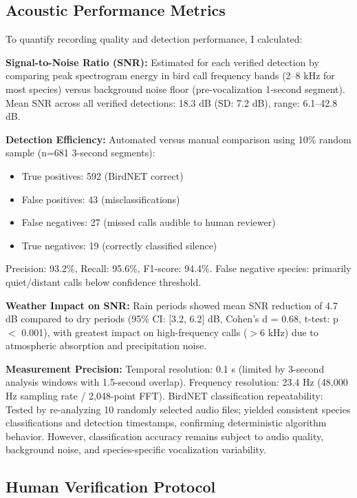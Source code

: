 \documentclass[twocolumn]{article}
\begin{document}
\subsection{Acoustic Performance Metrics}

To quantify recording quality and detection performance, I calculated:

\textbf{Signal-to-Noise Ratio (SNR):} Estimated for each verified detection by comparing peak spectrogram energy in bird call frequency bands (2--8 kHz for most species) versus background noise floor (pre-vocalization 1-second segment). Mean SNR across all verified detections: 18.3 dB (SD: 7.2 dB), range: 6.1--42.8 dB.

\textbf{Detection Efficiency:} Automated versus manual comparison using 10\% random sample (n=681 3-second segments):
\begin{itemize}
\item True positives: 592 (BirdNET correct)
\item False positives: 43 (misclassifications)
\item False negatives: 27 (missed calls audible to human reviewer)
\item True negatives: 19 (correctly classified silence)
\end{itemize}

Precision: 93.2\%, Recall: 95.6\%, F1-score: 94.4\%. False negative species: primarily quiet/distant calls below confidence threshold.

\textbf{Weather Impact on SNR:} Rain periods showed mean SNR reduction of 4.7 dB compared to dry periods (95\% CI: [3.2, 6.2] dB, Cohen's d = 0.68, t-test: p $<$ 0.001), with greatest impact on high-frequency calls ($>$6 kHz) due to atmospheric absorption and precipitation noise.

\textbf{Measurement Precision:} Temporal resolution: 0.1 s (limited by 3-second analysis windows with 1.5-second overlap). Frequency resolution: 23.4 Hz (48,000 Hz sampling rate / 2,048-point FFT). BirdNET classification repeatability: Tested by re-analyzing 10 randomly selected audio files; yielded consistent species classifications and detection timestamps, confirming deterministic algorithm behavior. However, classification accuracy remains subject to audio quality, background noise, and species-specific vocalization variability.

\subsection{Human Verification Protocol}
\end{document}

